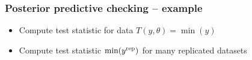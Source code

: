 \documentclass[10pt,handout]{beamer}
\begin{document}
\begin{frame}[fragile]

\frametitle{Posterior predictive checking -- example}

  \begin{itemize}
  \item<1-> Compute test statistic for data $T(y,\theta)=\min(y)$
  \item<2-> Compute test statistic $\min(y^{\rm rep})$ for many replicated datasets
  \end{itemize}
  \vspace{-1.5\baselineskip}

\end{frame}
\end{document}
